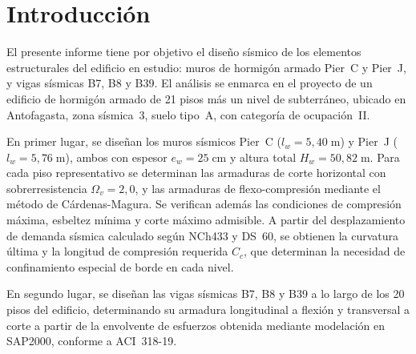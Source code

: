 \section{Introducción}

El presente informe tiene por objetivo el diseño sísmico de los elementos estructurales del edificio
en estudio: muros de hormigón armado Pier~C y Pier~J, y vigas sísmicas B7, B8 y B39. El análisis
se enmarca en el proyecto de un edificio de hormigón armado de 21 pisos más un nivel de subterráneo,
ubicado en Antofagasta, zona sísmica~3, suelo tipo~A, con categoría de ocupación~II.

En primer lugar, se diseñan los muros sísmicos Pier~C ($l_w = 5{,}40\;\text{m}$) y Pier~J
($l_w = 5{,}76\;\text{m}$), ambos con espesor $e_w = 25\;\text{cm}$ y altura total
$H_w = 50{,}82\;\text{m}$. Para cada piso representativo se determinan las armaduras de corte
horizontal con sobrerresistencia $\Omega_v = 2{,}0$, y las armaduras de flexo-compresión mediante
el método de Cárdenas-Magura. Se verifican además las condiciones de compresión máxima, esbeltez
mínima y corte máximo admisible. A partir del desplazamiento de demanda sísmica calculado según
NCh433 y DS~60, se obtienen la curvatura última y la longitud de compresión requerida $C_c$, que
determinan la necesidad de confinamiento especial de borde en cada nivel.

En segundo lugar, se diseñan las vigas sísmicas B7, B8 y B39 a lo largo de los 20 pisos del
edificio, determinando su armadura longitudinal a flexión y transversal a corte a partir de la
envolvente de esfuerzos obtenida mediante modelación en SAP2000, conforme a ACI~318-19.